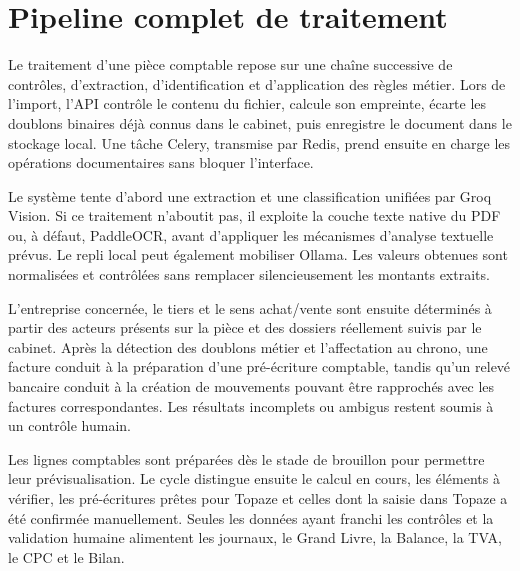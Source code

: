 \documentclass[12pt,a4paper,oneside]{report}
\begin{document}
\section{Pipeline complet de traitement}

Le traitement d'une pièce comptable repose sur une chaîne successive de
contrôles, d'extraction, d'identification et d'application des règles métier.
Lors de l'import, l'API contrôle le contenu du fichier, calcule son empreinte,
écarte les doublons binaires déjà connus dans le cabinet, puis enregistre le
document dans le stockage local. Une tâche Celery, transmise par Redis, prend
ensuite en charge les opérations documentaires sans bloquer l'interface.

Le système tente d'abord une extraction et une classification unifiées par
Groq Vision\cite{groq}. Si ce traitement n'aboutit pas, il exploite la couche texte native
du PDF ou, à défaut, PaddleOCR\cite{paddleocr}, avant d'appliquer les mécanismes d'analyse
textuelle prévus. Le repli local peut également mobiliser Ollama\cite{ollama}. Les valeurs obtenues sont normalisées et contrôlées sans
remplacer silencieusement les montants extraits.

L'entreprise concernée, le tiers et le sens achat/vente sont ensuite déterminés
à partir des acteurs présents sur la pièce et des dossiers réellement suivis
par le cabinet. Après la détection des doublons métier et l'affectation au
chrono, une facture conduit à la préparation d'une pré-écriture comptable,
tandis qu'un relevé bancaire conduit à la création de mouvements pouvant être
rapprochés avec les factures correspondantes. Les résultats incomplets ou
ambigus restent soumis à un contrôle humain.

Les lignes comptables sont préparées dès le stade de brouillon pour permettre
leur prévisualisation. Le cycle distingue ensuite le calcul en cours, les
éléments à vérifier, les pré-écritures prêtes pour Topaze et celles dont la
saisie dans Topaze a été confirmée manuellement. Seules les données ayant
franchi les contrôles et la validation humaine alimentent les journaux, le
Grand Livre, la Balance, la TVA, le CPC et le Bilan.
\end{document}
